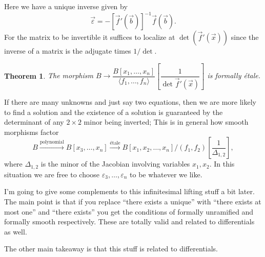 \documentclass[12pt]{article}
\numberwithin{equation}{section}
\newtheorem{theorem}{Theorem}[subsection]
\theoremstyle{definition}
\theoremstyle{remark}
\begin{document}
Here we have a unique inverse given by 
$$ \vec{\varepsilon} = -[\vec{f}'(\vec{b})]^{-1} \vec{f}(\vec{b}). $$
For the matrix to be invertible it suffices to localize at $\det(\vec{f}'(\vec{x}))$ since the inverse of a matrix is the adjugate times $1/\det$.
\begin{theorem}
	The morphism $B \to \dfrac{B[x_1,\ldots,x_n]}{\langle f_1,\ldots,f_n\rangle}\left [\dfrac{1}{\det{\vec{f}'(\vec{x})}}\right ]$ is formally \'etale. 
\end{theorem}
If there are many unknowns and just say two equations, then we are more likely to find a solution and the existence of a solution is guaranteed by the determinant of any $2\times 2$ minor being inverted; This is in general how smooth morphisms factor 
$$ B \xrightarrow{\mbox{polynomial}} B[x_3,\ldots,x_n] \xrightarrow{\mbox{\'etale}} B[x_1,x_2,\ldots,x_n]/(f_1,f_2) \left[ \frac{1}{\Delta_{1,2}}\right],$$
where $\Delta_{1,2}$ is the minor of the Jacobian involving variables $x_1,x_2$. 
In this situation we are free to choose $\varepsilon_3,\ldots,\varepsilon_n$ to be whatever we like.

I'm going to give some complements to this infinitesimal lifting stuff a bit later.
The main point is that if you replace ``there exists a unique'' with ``there exists at most one'' and ``there exists'' you get the conditions of formally unramified and formally smooth respectively. 
These are totally valid and related to differentials as well.

The other main takeaway is that this stuff is related to differentials.
\end{document}
